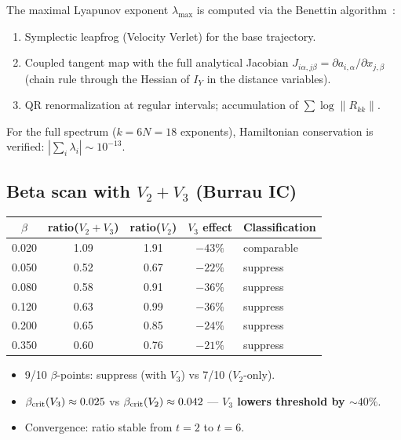\documentclass[11pt,a4paper]{article}
\def\textsc#1{#1}%
\newcommand{\lmax}{\lambda_{\max}}
\begin{document}
The maximal Lyapunov exponent $\lmax$ is computed via the Benettin
algorithm~\citep{Benettin1980}:
\begin{enumerate}[nosep]
  \item Symplectic leapfrog (Velocity Verlet) for the base trajectory.
  \item Coupled tangent map with the full analytical Jacobian
        $J_{i\alpha,j\beta} = \partial a_{i,\alpha}/\partial x_{j,\beta}$
        (chain rule through the Hessian of $I_Y$ in the distance variables).
  \item QR renormalization at regular intervals; accumulation of
        $\sum \log\|R_{kk}\|$.
\end{enumerate}

For the full spectrum ($k = 6N = 18$ exponents), Hamiltonian conservation
is verified: $|\sum_i \lambda_i| \sim 10^{-13}$.

\subsection{Beta scan with $V_2 + V_3$ (Burrau IC)}

\begin{center}
\begin{tabular}{ccccl}
  \toprule
  $\beta$ & ratio($V_2{+}V_3$) & ratio($V_2$) & $V_3$ effect & Classification \\
  \midrule
  0.020 & 1.09 & 1.91 & $-43\%$ & comparable \\
  0.050 & 0.52 & 0.67 & $-22\%$ & \textsc{suppress} \\
  0.080 & 0.58 & 0.91 & $-36\%$ & \textsc{suppress} \\
  0.120 & 0.63 & 0.99 & $-36\%$ & \textsc{suppress} \\
  0.200 & 0.65 & 0.85 & $-24\%$ & \textsc{suppress} \\
  0.350 & 0.60 & 0.76 & $-21\%$ & \textsc{suppress} \\
  \bottomrule
\end{tabular}
\end{center}

\begin{itemize}[nosep]
  \item 9/10 $\beta$-points: \textsc{suppress} (with $V_3$) vs 7/10
        ($V_2$-only).
  \item $\beta_{\rm crit}(V_3) \approx 0.025$ vs
        $\beta_{\rm crit}(V_2) \approx 0.042$ --- \textbf{$V_3$ lowers
        threshold by $\sim40\%$}.
  \item Convergence: ratio stable from $t = 2$ to $t = 6$.
\end{itemize}
\end{document}
